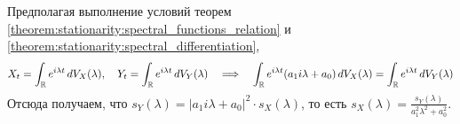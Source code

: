 \begin{solution}
    Предполагая выполнение условий теорем \ref{theorem:stationarity:spectral_functions_relation} и \ref{theorem:stationarity:spectral_differentiation},
    \[
        X_t = \int_{\mathbb{R}} e^{i \lambda t} \, dV_X(\lambda),
        \quad
        Y_t = \int_{\mathbb{R}} e^{i \lambda t} \, dV_Y(\lambda)
        \quad \Longrightarrow \quad
        \int_{\mathbb{R}} e^{i \lambda t} (a_1 i \lambda + a_0) \, dV_X(\lambda) = \int_{\mathbb{R}} e^{i \lambda t} \, dV_Y(\lambda)
    \]
    Отсюда получаем, что $ s_Y(\lambda) = |a_1 i \lambda + a_0|^2 \cdot s_X(\lambda) $,
    то есть $ s_X(\lambda) = \frac{s_Y(\lambda)}{a_1^2 \lambda^2 + a_0^2} $.
\end{solution}
